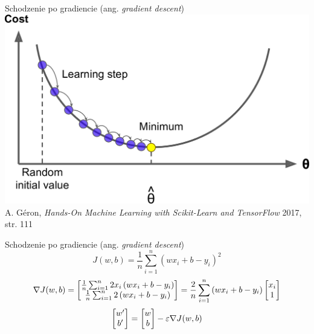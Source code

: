 \documentclass{sa}
\newcommand{\ang}[1]{(ang. \emph{#1})}
\newcommand{\grad}{\ensuremath\nabla}
\begin{document}
\begin{frame}{Schodzenie po gradiencie \ang{gradient descent}}
\centering
\includegraphics[width=.95\textwidth]{grad2.png}
{\vfill\footnotesize A. Géron, \emph{Hands-On Machine Learning with Scikit-Learn and TensorFlow} 2017, str. 111}
\end{frame}

\begin{frame}{Schodzenie po gradiencie \ang{gradient descent}}
\[ J(w, b) = \frac{1}{n}\sum_{i=1}^n \left(wx_i+b-y_i\right)^2 \]
\[ \grad J(w,b) = \begin{bmatrix}
\frac{1}{n}\sum_{i=1}^n 2x_i\left(wx_i+b-y_i\right) \\
\frac{1}{n}\sum_{i=1}^n 2\left(wx_i+b-y_i\right)
\end{bmatrix}
=
\frac{2}{n}\sum_{i=1}^n 
\left(wx_i+b-y_i\right) \begin{bmatrix}
x_i \\
1
\end{bmatrix}
\]
\[
\begin{bmatrix}
w' \\ b'
\end{bmatrix}
=
\begin{bmatrix}
w \\ b
\end{bmatrix}
-\varepsilon \grad J(w,b)
\]
\end{frame}
\end{document}
